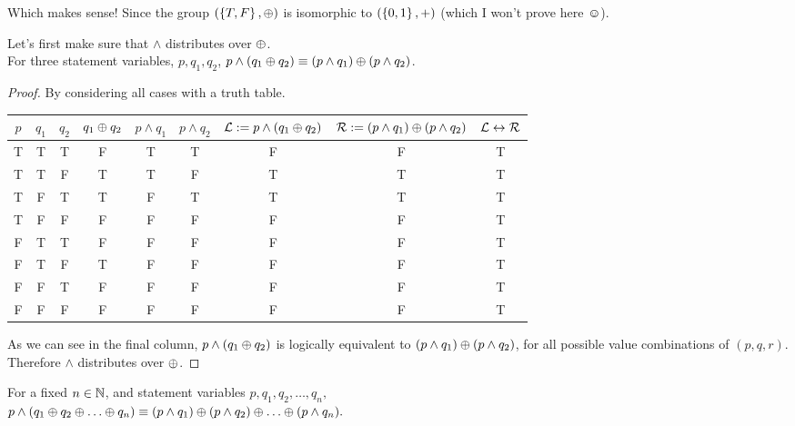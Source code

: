 \documentclass[a4paper,12pt]{report}
\begin{document}
Which makes sense! Since the group $(\left\lbrace T,F \right\rbrace,\oplus)$ is isomorphic to $(\left\lbrace 0,1 \right\rbrace, {+})$ (which I won't prove here $\smiley$).

\newpage
{}
\sol Let's first make sure that $\land$ distributes over $\oplus$. \\

 For three statement variables, $p,q_1,q_2$, $p\land(q_1 \oplus q_2) \equiv (p\land q_1) \oplus (p\land q_2)$.
\begin{proof}
	By considering all cases with a truth table. 
	\begin{center}\begin{tabular}{|ccc|ccc|cc|c|}
		\hline
		$p$ & $q_1$ & $q_2$ & $q_1\oplus q_2$ & $p\land q_1$ & $p\land q_2$ & $\mathcal{L} := p\land(q_1\oplus q_2)$ & $\mathcal{R} := (p\land q_1) \oplus (p\land q_2)$ & $\mathcal{L}\leftrightarrow\mathcal{R}$ \\ \hline 
		T & T & T & F & T & T & F & F & T \\
		T & T & F & T & T & F & T & T & T \\
		T & F & T & T & F & T & T & T & T \\
		T & F & F & F & F & F & F & F & T \\
		F & T & T & F & F & F & F & F & T \\
		F & T & F & T & F & F & F & F & T \\
		F & F & T & F & F & F & F & F & T \\
		F & F & F & F & F & F & F & F & T \\ \hline
	\end{tabular}\end{center}
	As we can see in the final column, $p\land(q_1 \oplus q_2)$ is logically equivalent to $(p\land q_1) \oplus (p\land q_2)$, for all possible value combinations of $(p,q,r)$. \\
	Therefore $\land$ distributes over $\oplus$.
\end{proof}

 For a fixed $n\in\mathbb{N}$, and statement variables $p,q_1,q_2,\dots,q_n,$ \\ $p \land (q_1 \oplus q_2 \oplus \ldots \oplus q_n) \equiv (p \land q_1) \oplus (p \land q_2) \oplus \ldots \oplus (p \land q_n).$ \\
\end{document}
